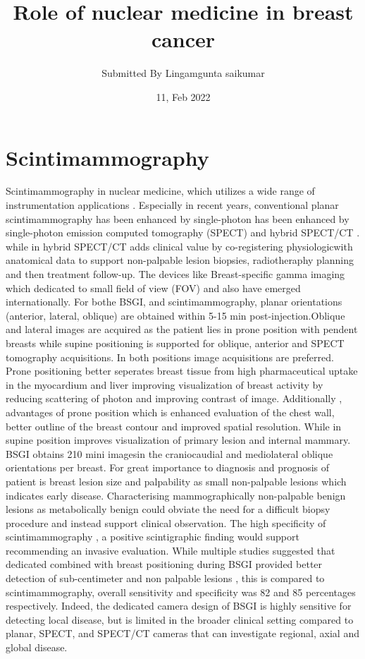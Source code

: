 \documentclass{article}
\title{Role of nuclear medicine in breast cancer}
\author{Submitted By Lingamgunta saikumar}
\date{11, Feb 2022}
\begin{document}
\maketitle

\section{Scintimammography}
Scintimammography in nuclear medicine, which utilizes a wide range of instrumentation 
applications . Especially in recent years, conventional planar scintimammography has been 
enhanced by single-photon has been enhanced by single-photon emission computed 
tomography (SPECT) and hybrid SPECT/CT . while in hybrid SPECT/CT adds clinical value by 
co-registering physiologicwith anatomical data to support non-palpable lesion biopsies, 
radiotheraphy planning and then treatment follow-up. The devices like Breast-specific
gamma imaging which dedicated to small field of view (FOV) and also have emerged 
internationally. For bothe BSGI, and scintimammography, planar orientations (anterior, 
lateral, oblique) are obtained within 5-15 min post-injection.Oblique and lateral images are 
acquired as the patient lies in prone position with pendent breasts while supine positioning 
is supported for oblique, anterior and SPECT tomography acquisitions. In both positions 
image acquisitions are preferred. Prone positioning better seperates breast tissue from high 
pharmaceutical uptake in the myocardium and liver improving visualization of breast activity 
by reducing scattering of photon and improving contrast of image. Additionally , advantages 
of prone position which is enhanced evaluation of the chest wall, better outline of the 
breast contour and improved spatial resolution. While in supine position improves 
visualization of primary lesion and internal mammary. BSGI obtains 210 mini imagesin the 
craniocaudial and mediolateral oblique orientations per breast. For great importance to 
diagnosis and prognosis of patient is breast lesion size and palpability as small non-palpable 
lesions which indicates early disease. Characterising mammographically non-palpable 
benign lesions as metabolically benign could obviate the need for a difficult biopsy
procedure and instead support clinical observation. The high specificity of 
scintimammography , a positive scintigraphic finding would support recommending an 
invasive evaluation. While multiple studies suggested that dedicated combined with breast 
positioning during BSGI provided better detection of sub-centimeter and non palpable 
lesions , this is compared to scintimammography, overall sensitivity and specificity was 82%
and 85%
percentages respectively. Indeed, the dedicated camera design of BSGI is highly sensitive for 
detecting local disease, but is limited in the broader clinical setting compared to planar, 
SPECT, and SPECT/CT cameras that can investigate regional, axial and global disease. 
\end{document}
